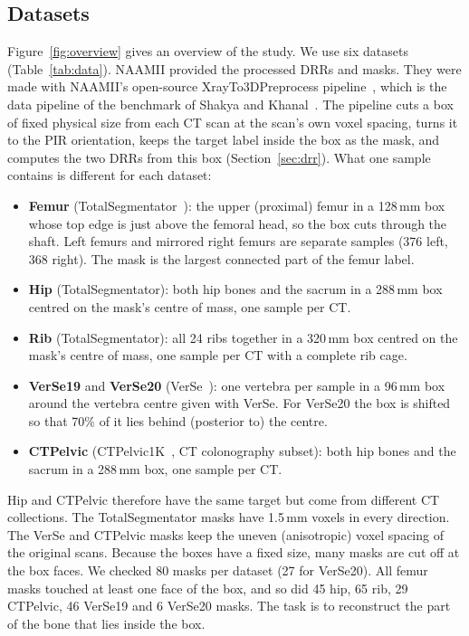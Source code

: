 \documentclass[11pt]{article}
\begin{document}
\subsection{Datasets}\label{sec:data}
Figure~\ref{fig:overview} gives an overview of the study. We use six datasets (Table~\ref{tab:data}). NAAMII provided the processed DRRs and masks. They were made with NAAMII's open-source XrayTo3DPreprocess pipeline~\cite{xrayto3dpreprocess}, which is the data pipeline of the benchmark of Shakya and Khanal~\cite{shakya2023}. The pipeline cuts a box of fixed physical size from each CT scan at the scan's own voxel spacing, turns it to the PIR orientation, keeps the target label inside the box as the mask, and computes the two DRRs from this box (Section~\ref{sec:drr}). What one sample contains is different for each dataset:
\begin{itemize}
\item \textbf{Femur} (TotalSegmentator~\cite{wasserthal2023}): the upper (proximal) femur in a 128\,mm box whose top edge is just above the femoral head, so the box cuts through the shaft. Left femurs and mirrored right femurs are separate samples (376 left, 368 right). The mask is the largest connected part of the femur label.
\item \textbf{Hip} (TotalSegmentator): both hip bones and the sacrum in a 288\,mm box centred on the mask's centre of mass, one sample per CT.
\item \textbf{Rib} (TotalSegmentator): all 24 ribs together in a 320\,mm box centred on the mask's centre of mass, one sample per CT with a complete rib cage.
\item \textbf{VerSe19} and \textbf{VerSe20} (VerSe~\cite{verse2021}): one vertebra per sample in a 96\,mm box around the vertebra centre given with VerSe. For VerSe20 the box is shifted so that 70\% of it lies behind (posterior to) the centre.
\item \textbf{CTPelvic} (CTPelvic1K~\cite{pelvic2020}, CT colonography subset): both hip bones and the sacrum in a 288\,mm box, one sample per CT.
\end{itemize}
Hip and CTPelvic therefore have the same target but come from different CT collections. The TotalSegmentator masks have 1.5\,mm voxels in every direction. The VerSe and CTPelvic masks keep the uneven (anisotropic) voxel spacing of the original scans. Because the boxes have a fixed size, many masks are cut off at the box faces. We checked 80 masks per dataset (27 for VerSe20). All femur masks touched at least one face of the box, and so did 45 hip, 65 rib, 29 CTPelvic, 46 VerSe19 and 6 VerSe20 masks. The task is to reconstruct the part of the bone that lies inside the box.
\end{document}
